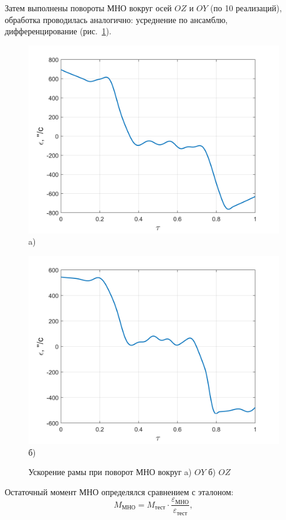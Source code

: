 Затем выполнены повороты МНО вокруг осей $OZ$ и $OY$ (по 10 реализаций), обработка проводилась аналогично:
усреднение по ансамблю, дифференцирование
(рис.~\cref{fig:oz-gyro}).

\begin{figure}[!h]
	\begin{minipage}[b]{0.49\linewidth}\centering
		\includegraphics[width=0.8\linewidth]{matlab/img/oy-gyro-acc.png}\\[-2pt] a)
	\end{minipage}
	\hfill
	\begin{minipage}[b]{0.49\linewidth}\centering
		\includegraphics[width=0.8\linewidth]{matlab/img/oz-gyro-acc.png}\\[-2pt] б)
	\end{minipage}
	\caption{Ускорение рамы при поворот МНО вокруг a) $OY$ б) $OZ$}
	\label{fig:oz-gyro}
\end{figure}

Остаточный момент МНО определялся сравнением с эталоном:
\[
M_{\text{МНО}} = M_{\text{тест}}\cdot\frac{\varepsilon_{\text{МНО}}}{\varepsilon_{\text{тест}}}\!,
\]

